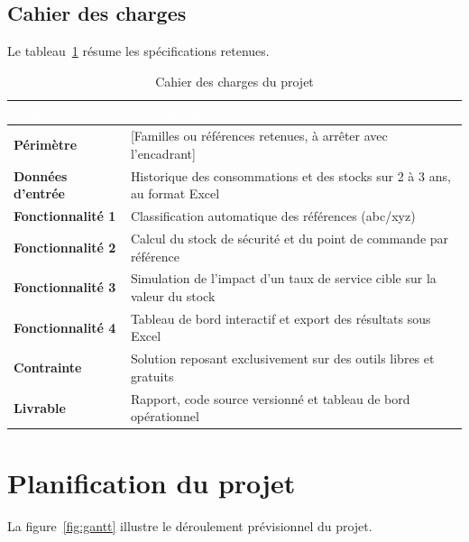 \subsection{Cahier des charges}

Le tableau~\ref{tab:cahier_charges} résume les spécifications retenues.

\begin{table}[H]
  \centering
  \caption{Cahier des charges du projet}
  \label{tab:cahier_charges}
  \renewcommand{\arraystretch}{1.4}
  \begin{tabularx}{\textwidth}{|>{\bfseries\color{iacsPrimary}}l|X|}
    \hline
    \rowcolor{iacsTeal}
    \textbf{\textcolor{white}{Critère}} & \textbf{\textcolor{white}{Description}} \\
    \hline
    Périmètre & [Familles ou références retenues, à arrêter avec l'encadrant] \\
    \hline
    Données d'entrée & Historique des consommations et des stocks sur 2 à 3 ans, au format Excel \\
    \hline
    Fonctionnalité 1 & Classification automatique des références (\gls{abc}/\gls{xyz}) \\
    \hline
    Fonctionnalité 2 & Calcul du stock de sécurité et du point de commande par référence \\
    \hline
    Fonctionnalité 3 & Simulation de l'impact d'un taux de service cible sur la valeur du stock \\
    \hline
    Fonctionnalité 4 & Tableau de bord interactif et export des résultats sous Excel \\
    \hline
    Contrainte & Solution reposant exclusivement sur des outils libres et gratuits \\
    \hline
    Livrable & Rapport, code source versionné et tableau de bord opérationnel \\
    \hline
  \end{tabularx}
\end{table}

\section{Planification du projet}
\label{sec:planification}

La figure~\ref{fig:gantt} illustre le déroulement prévisionnel du projet.

